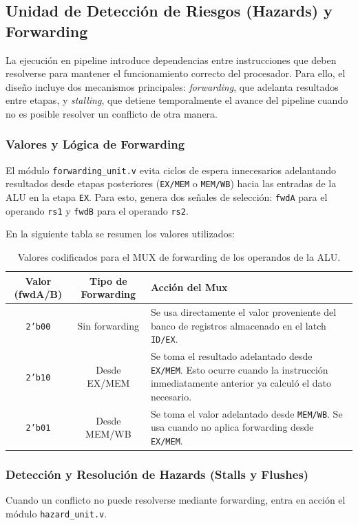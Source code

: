 \subsection{Unidad de Detección de Riesgos (Hazards) y Forwarding}
La ejecución en pipeline introduce dependencias entre instrucciones que deben resolverse para mantener el funcionamiento correcto del procesador. Para ello, el diseño incluye dos mecanismos principales: \textit{forwarding}, que adelanta resultados entre etapas, y \textit{stalling}, que detiene temporalmente el avance del pipeline cuando no es posible resolver un conflicto de otra manera.

\subsubsection{Valores y Lógica de Forwarding}
El módulo \texttt{forwarding\_unit.v} evita ciclos de espera innecesarios adelantando resultados desde etapas posteriores (\texttt{EX/MEM} o \texttt{MEM/WB}) hacia las entradas de la ALU en la etapa \texttt{EX}. Para esto, genera dos señales de selección: \texttt{fwdA} para el operando \texttt{rs1} y \texttt{fwdB} para el operando \texttt{rs2}.

En la siguiente tabla se resumen los valores utilizados:

\begin{table}[h]
\centering
\begin{tabular}{|c|c|p{8.5cm}|}
\hline
\textbf{Valor (fwdA/B)} & \textbf{Tipo de Forwarding} & \textbf{Acción del Mux} \\ \hline
\texttt{2'b00} & Sin forwarding & Se usa directamente el valor proveniente del banco de registros almacenado en el latch \texttt{ID/EX}. \\ \hline
\texttt{2'b10} & Desde EX/MEM & Se toma el resultado adelantado desde \texttt{EX/MEM}. Esto ocurre cuando la instrucción inmediatamente anterior ya calculó el dato necesario. \\ \hline
\texttt{2'b01} & Desde MEM/WB & Se toma el valor adelantado desde \texttt{MEM/WB}. Se usa cuando no aplica forwarding desde \texttt{EX/MEM}. \\ \hline
\end{tabular}
\caption{Valores codificados para el MUX de forwarding de los operandos de la ALU.}
\end{table}

\subsubsection{Detección y Resolución de Hazards (Stalls y Flushes)}
Cuando un conflicto no puede resolverse mediante forwarding, entra en acción el módulo \texttt{hazard\_unit.v}.


